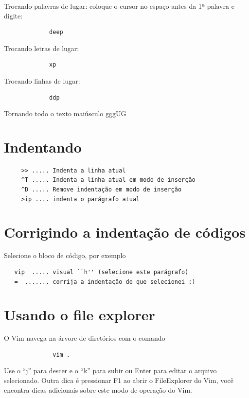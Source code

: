 \documentclass[10pt,a4paper,openany]{book}
\begin{document}
Trocando palavras de lugar: coloque o cursor no espaço antes da 1ª palavra e digite:

\begin{verbatim}
			 deep
\end{verbatim}

Trocando letras de lugar:

\begin{verbatim}
			 xp
\end{verbatim}

Trocando linhas de lugar:

\begin{verbatim}
			 ddp
\end{verbatim}

Tornando todo o texto maiúsculo
 gggUG

\section{Indentando }

\begin{verbatim}
	 >> ..... Indenta a linha atual
	 ^T ..... Indenta a linha atual em modo de inserção
	 ^D ..... Remove indentação em modo de inserção
	 >ip .... indenta o parágrafo atual
\end{verbatim}

\section{Corrigindo a indentação de códigos}
\label{Corrigindo a indentação de códigos}
Selecione o bloco de código, por exemplo

\begin{verbatim}
   vip  ..... visual ``h'' (selecione este parágrafo)
   =  ....... corrija a indentação do que selecionei :)
\end{verbatim}

\section{Usando o file explorer}
\label{Usando o file explorer}
O Vim navega na árvore de diretórios com o comando

\begin{verbatim}
			  vim .
\end{verbatim}

Use o ``j'' para descer e o ``k'' para subir ou Enter para editar o
arquivo selecionado. Outra dica é pressionar F1 ao abrir o
FileExplorer do Vim, você encontra dicas adicionais sobre este modo de
operação do Vim.
\end{document}
